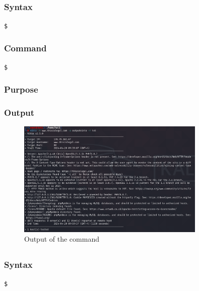 \documentclass[11pt]{article}
\begin{document}
\subsection{}

\subsubsection*{Syntax}
\begin{verbatim}
$
\end{verbatim}

\subsubsection*{Command}
\begin{verbatim}
$
\end{verbatim}

\subsubsection*{Purpose}

\subsubsection*{Output}
\begin{figure}[H]
    \centering
    \includegraphics[width=0.8\textwidth]{assignment 8 (7).png}
    \caption{Output of the command}
    \label{fig:1}
\end{figure}

\subsection{}

\subsubsection*{Syntax}
\begin{verbatim}
$
\end{verbatim}
\end{document}
